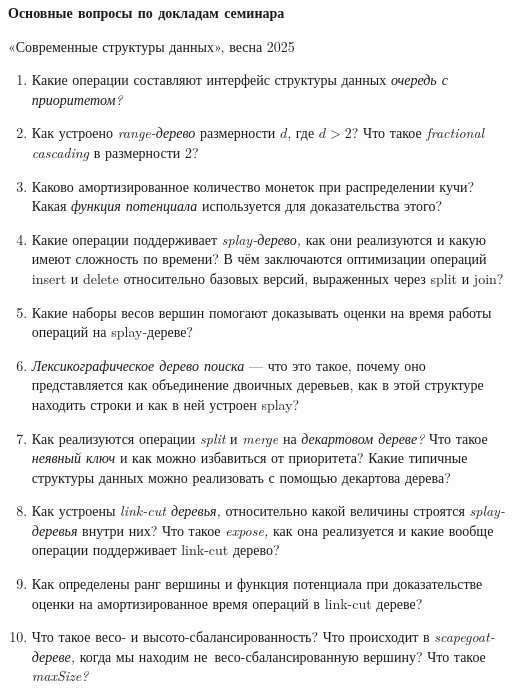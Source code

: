 \documentclass[a4paper,10pt]{article}
\begin{document}
  \begin{center}
  \large\bf Основные вопросы по докладам семинара
  
  «Современные структуры данных», весна 2025
\end{center}

\begin{enumerate}[leftmargin=*,itemsep=-0.1mm]
\item Какие операции составляют интерфейс структуры данных {\sl очередь с приоритетом?}

\item Как устроено {\sl range-дерево} размерности \(d\), где \(d>2\)? Что такое {\sl fractional cascading} в размерности 2?

\item Каково амортизированное количество монеток при распределении кучи? Какая {\sl функция потенциала} используется для доказательства этого?

\item Какие операции поддерживает {\sl splay-дерево,} как они реализуются и какую имеют сложность по времени?
В чём заключаются оптимизации операций insert и delete относительно базовых версий, выраженных
через split и join?

\item Какие наборы весов вершин помогают доказывать оценки на время работы операций на splay-дереве?

\item {\sl Лексикографическое дерево поиска} — что это такое, почему оно представляется как объединение
двоичных деревьев, как в этой структуре находить строки и как в ней устроен splay? 

\item Как реализуются операции {\sl split} и {\sl merge} на {\sl декартовом дереве?} Что такое {\sl неявный ключ} и как можно избавиться от приоритета? Какие типичные структуры данных можно реализовать с помощью декартова дерева?

\item Как устроены {\sl link-cut деревья,} относительно какой величины строятся {\sl splay-деревья} внутри них? Что такое {\sl expose,} как она реализуется и какие вообще операции поддерживает link-cut дерево?

\item Как определены ранг вершины и функция потенциала при доказательстве оценки на амортизированное время операций в link-cut дереве?

\item Что такое весо- и высото-сбалансированность? Что происходит в {\sl scapegoat-дереве,} когда мы находим не~весо-сбалансированную вершину? Что такое {\sl maxSize?}


\end{enumerate}
\end{document}
